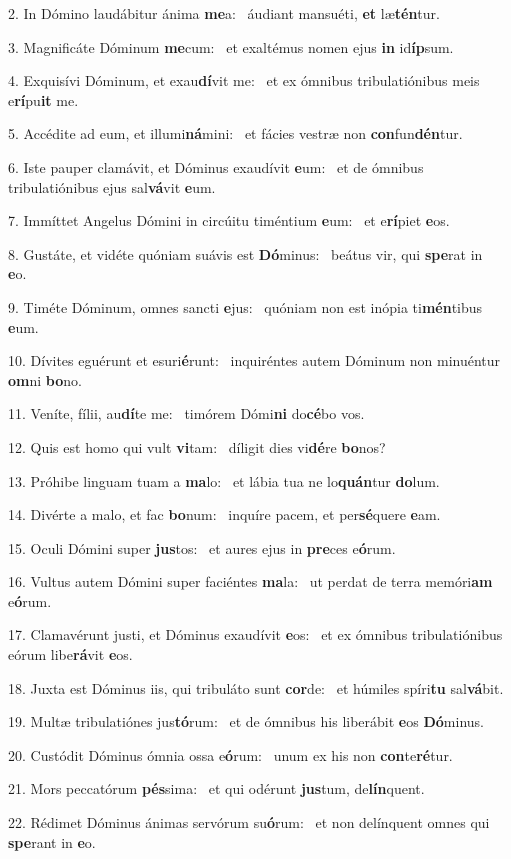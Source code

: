 2. In Dómino laudábitur ánima \textbf{me}a: \ast\  áudiant mansuéti, \textbf{et} læ\textbf{tén}tur.\

3. Magnificáte Dóminum \textbf{me}cum: \ast\  et exaltémus nomen ejus \textbf{in} id\textbf{íp}sum.\

4. Exquisívi Dóminum, et exau\textbf{dí}vit me: \ast\  et ex ómnibus tribulatiónibus meis e\textbf{rí}pu\textbf{it} me.\

5. Accédite ad eum, et illumi\textbf{ná}mini: \ast\  et fácies vestræ non \textbf{con}fun\textbf{dén}tur.\

6. Iste pauper clamávit, et Dóminus exaudívit \textbf{e}um: \ast\  et de ómnibus tribulatiónibus ejus sal\textbf{vá}vit \textbf{e}um.\

7. Immíttet Angelus Dómini in circúitu timéntium \textbf{e}um: \ast\  et e\textbf{rí}piet \textbf{e}os.\

8. Gustáte, et vidéte quóniam suávis est \textbf{Dó}minus: \ast\  beátus vir, qui \textbf{spe}rat in \textbf{e}o.\

9. Timéte Dóminum, omnes sancti \textbf{e}jus: \ast\  quóniam non est inópia ti\textbf{mén}tibus \textbf{e}um.\

10. Dívites eguérunt et esuri\textbf{é}runt: \ast\  inquiréntes autem Dóminum non minuéntur \textbf{om}ni \textbf{bo}no.\

11. Veníte, fílii, au\textbf{dí}te me: \ast\  timórem Dómi\textbf{ni} do\textbf{cé}bo vos.\

12. Quis est homo qui vult \textbf{vi}tam: \ast\  díligit dies vi\textbf{dé}re \textbf{bo}nos?\

13. Próhibe linguam tuam a \textbf{ma}lo: \ast\  et lábia tua ne lo\textbf{quán}tur \textbf{do}lum.\

14. Divérte a malo, et fac \textbf{bo}num: \ast\  inquíre pacem, et per\textbf{sé}quere \textbf{e}am.\

15. Oculi Dómini super \textbf{jus}tos: \ast\  et aures ejus in \textbf{pre}ces e\textbf{ó}rum.\

16. Vultus autem Dómini super faciéntes \textbf{ma}la: \ast\  ut perdat de terra memóri\textbf{am} e\textbf{ó}rum.\

17. Clamavérunt justi, et Dóminus exaudívit \textbf{e}os: \ast\  et ex ómnibus tribulatiónibus eórum libe\textbf{rá}vit \textbf{e}os.\

18. Juxta est Dóminus iis, qui tribuláto sunt \textbf{cor}de: \ast\  et húmiles spíri\textbf{tu} sal\textbf{vá}bit.\

19. Multæ tribulatiónes jus\textbf{tó}rum: \ast\  et de ómnibus his liberábit \textbf{e}os \textbf{Dó}minus.\

20. Custódit Dóminus ómnia ossa e\textbf{ó}rum: \ast\  unum ex his non \textbf{con}te\textbf{ré}tur.\

21. Mors peccatórum \textbf{pés}sima: \ast\  et qui odérunt \textbf{jus}tum, de\textbf{lín}quent.\

22. Rédimet Dóminus ánimas servórum su\textbf{ó}rum: \ast\  et non delínquent omnes qui \textbf{spe}rant in \textbf{e}o.\

